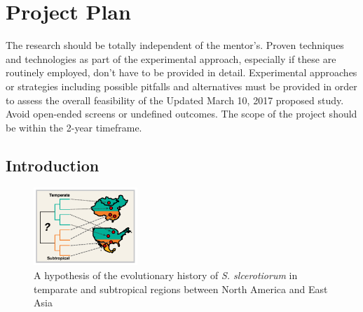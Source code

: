 \documentclass[12pt,letterpaper]{article}
\begin{document}
\section{Project Plan}

The research should be totally independent of the mentor's. Proven techniques
and technologies as part of the experimental approach, especially if these are
routinely employed, don't have to be provided in detail. Experimental
approaches or strategies including possible pitfalls and alternatives must be
provided in order to assess the overall feasibility of the Updated March 10,
2017 proposed study. Avoid open-ended screens or undefined outcomes. The scope
of the project should be within the 2-year timeframe.

\subsection{Introduction}




\begin{figure} %
  \label{fig:us-china}
  \includegraphics[width=0.35\textwidth]{figure/us-china.pdf}
  \caption{A hypothesis of the evolutionary history of \textit{S. slcerotiorum} in temparate and subtropical regions between North America and East Asia}
\end{figure}
\end{document}
